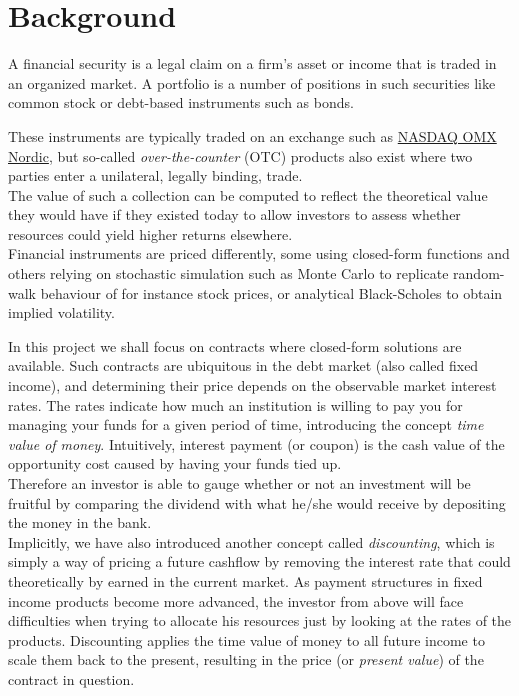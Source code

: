 \chapter{Background}

A financial security is a legal claim on a firm's asset or income 
that is traded in an organized market\cite{alexander2008market}.
A portfolio is a number of positions in such securities like common
stock or debt-based instruments such as bonds.

These instruments are typically traded on an exchange such as 
\href{http://www.nasdaqomxnordic.com/}{NASDAQ OMX Nordic}, but so-called
\emph{over-the-counter} (OTC) products also exist where two parties enter
a unilateral, legally binding, trade.\\
The value of such a collection can be computed to reflect the theoretical 
value they would have if they existed today to allow investors to assess
whether resources could yield higher returns elsewhere.\\

Financial instruments are priced differently, some using closed-form functions
and others relying on stochastic simulation such as Monte Carlo to replicate 
random-walk behaviour of for instance stock prices, or analytical Black-Scholes
to obtain implied volatility\cite{HULL}.

In this project we shall focus on contracts where closed-form solutions are
available. Such contracts are ubiquitous in the debt market (also called fixed
income), and determining their price depends on the observable market interest
rates. The rates indicate how much an institution is willing to pay you for
managing your funds for a given period of time, introducing the concept
\emph{time value of money}. Intuitively, interest payment (or coupon) is
the cash value of the opportunity cost caused by having your funds tied up.\\
Therefore an investor is able to gauge whether or not an investment will be
fruitful by comparing the dividend with what he/she would receive by depositing
the money in the bank.\\

Implicitly, we have also introduced another concept called \emph{discounting},
which is simply a way of pricing a future cashflow by removing the interest
rate that could theoretically by earned in the current market. As payment structures
in fixed income products become more advanced, the investor from above will 
face difficulties when trying to allocate his resources just by looking at the
rates of the products. Discounting applies the time value of money to all
future income to scale them back to the present, resulting in the price (or
\emph{present value}) of the contract in question. 

